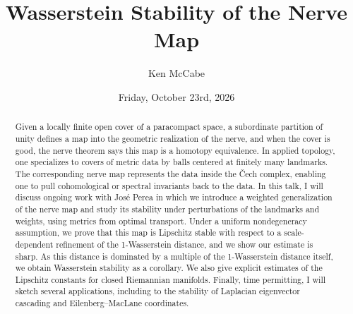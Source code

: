 \documentclass{UAmathtalk}
\author{ Ken McCabe }
\title{Wasserstein Stability of the Nerve Map}
\date{Friday, October 23rd, 2026}
\begin{document}
\maketitle
\renewcommand*{\abstractsize}{\fontsize{13.5}{16.2}\selectfont}
\begin{abstract}
    {
Given a locally finite open cover of a paracompact space, a subordinate partition of unity defines a map into the geometric realization of the nerve, and when the cover is good, the nerve theorem says this map is a homotopy equivalence. In applied topology, one specializes to covers of metric data by balls centered at finitely many landmarks. The corresponding nerve map represents the data inside the \v{C}ech complex, enabling one to pull cohomological or spectral invariants back to the data. In this talk, I will discuss ongoing work with José Perea in which we introduce a weighted generalization of the nerve map and study its stability under perturbations of the landmarks and weights, using metrics from optimal transport. Under a uniform nondegeneracy assumption, we prove that this map is Lipschitz stable with respect to a scale-dependent refinement of the 1-Wasserstein distance, and we show our estimate is sharp. As this distance is dominated by a multiple of the 1-Wasserstein distance itself, we obtain Wasserstein stability as a corollary. We also give explicit estimates of the Lipschitz constants for closed Riemannian manifolds. Finally, time permitting, I will sketch several applications, including to the stability of Laplacian eigenvector cascading and Eilenberg--MacLane coordinates.
    }
\end{abstract}
\end{document}
